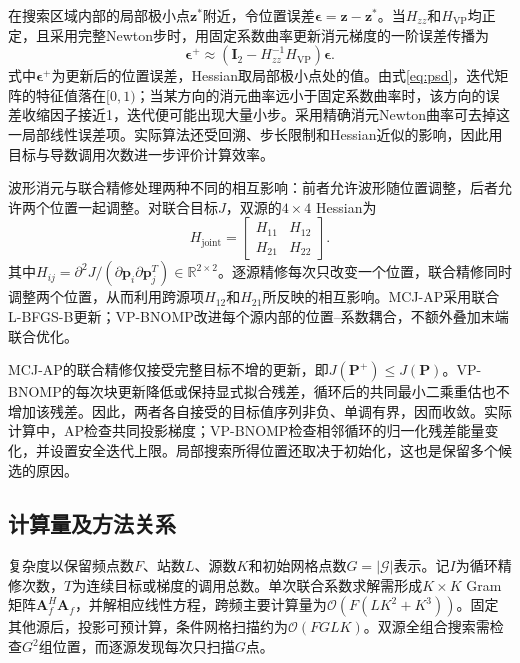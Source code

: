 \documentclass[a4paper,fleqn]{cas-sc}
\numberwithin{equation}{section}
\numberwithin{figure}{section}
\numberwithin{table}{section}
\newcommand{\R}{\mathbb R}
\begin{document}
在搜索区域内部的局部极小点$\bm z^*$附近，令位置误差$\bm\epsilon=\bm z-\bm z^*$。当$H_{zz}$和$H_{\mathrm{VP}}$均正定，且采用完整Newton步时，用固定系数曲率更新消元梯度的一阶误差传播为
\begin{equation}
 \bm\epsilon^{+}\approx
 \left(\bm I_2-H_{zz}^{-1}H_{\mathrm{VP}}\right)\bm\epsilon .\label{eq:localrate}
\end{equation}
式中$\bm\epsilon^+$为更新后的位置误差，Hessian取局部极小点处的值。由式\eqref{eq:psd}，迭代矩阵的特征值落在$[0,1)$；当某方向的消元曲率远小于固定系数曲率时，该方向的误差收缩因子接近1，迭代便可能出现大量小步。采用精确消元Newton曲率可去掉这一局部线性误差项。实际算法还受回溯、步长限制和Hessian近似的影响，因此用目标与导数调用次数进一步评价计算效率。

波形消元与联合精修处理两种不同的相互影响：前者允许波形随位置调整，后者允许两个位置一起调整。对联合目标$J$，双源的$4\times4$ Hessian为
\begin{equation}
 H_{\mathrm{joint}}=
 \begin{bmatrix}H_{11}&H_{12}\\H_{21}&H_{22}\end{bmatrix} .
\end{equation}
其中$H_{ij}=\partial^2J/(\partial\bm p_i\partial\bm p_j^T)\in\R^{2\times2}$。逐源精修每次只改变一个位置，联合精修同时调整两个位置，从而利用跨源项$H_{12}$和$H_{21}$所反映的相互影响。MCJ-AP采用联合L-BFGS-B更新；VP-BNOMP改进每个源内部的位置--系数耦合，不额外叠加末端联合优化。

MCJ-AP的联合精修仅接受完整目标不增的更新，即$J(\bm P^+)\le J(\bm P)$。VP-BNOMP的每次块更新降低或保持显式拟合残差，循环后的共同最小二乘重估也不增加该残差。因此，两者各自接受的目标值序列非负、单调有界，因而收敛。实际计算中，AP检查共同投影梯度；VP-BNOMP检查相邻循环的归一化残差能量变化，并设置安全迭代上限。局部搜索所得位置还取决于初始化，这也是保留多个候选的原因。

\subsection{计算量及方法关系}\label{sec:complexity}
复杂度以保留频点数$F$、站数$L$、源数$K$和初始网格点数$G=|\mathcal G|$表示。记$I$为循环精修次数，$T$为连续目标或梯度的调用总数。单次联合系数求解需形成$K\times K$ Gram矩阵$\bm A_f^H\bm A_f$，并解相应线性方程，跨频主要计算量为$\mathcal O(F(LK^2+K^3))$。固定其他源后，投影可预计算，条件网格扫描约为$\mathcal O(FGLK)$。双源全组合搜索需检查$G^2$组位置，而逐源发现每次只扫描$G$点。
\end{document}
